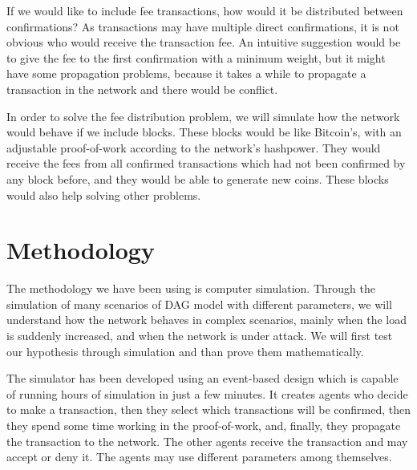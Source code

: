 If we would like to include fee transactions, how would it be distributed between confirmations? As transactions may have multiple direct confirmations, it is not obvious who would receive the transaction fee. An intuitive suggestion would be to give the fee to the first confirmation with a minimum weight, but it might have some propagation problems, because it takes a while to propagate a transaction in the network and there would be conflict.

In order to solve the fee distribution problem, we will simulate how the network would behave if we include blocks. These blocks would be like Bitcoin's, with an adjustable proof-of-work according to the network's hashpower. They would receive the fees from all confirmed transactions which had not been confirmed by any block before, and they would be able to generate new coins. These blocks would also help solving other problems.


\chapter{Methodology}

The methodology we have been using is computer simulation. Through the simulation of many scenarios of DAG model with different parameters, we will understand how the network behaves in complex scenarios, mainly when the load is suddenly increased, and when the network is under attack. We will first test our hypothesis through simulation and than prove them mathematically.

The simulator has been developed using an event-based design which is capable of running hours of simulation in just a few minutes. It creates agents who decide to make a transaction, then they select which transactions will be confirmed, then they spend some time working in the proof-of-work, and, finally, they propagate the transaction to the network. The other agents receive the transaction and may accept or deny it. The agents may use different parameters among themselves.

